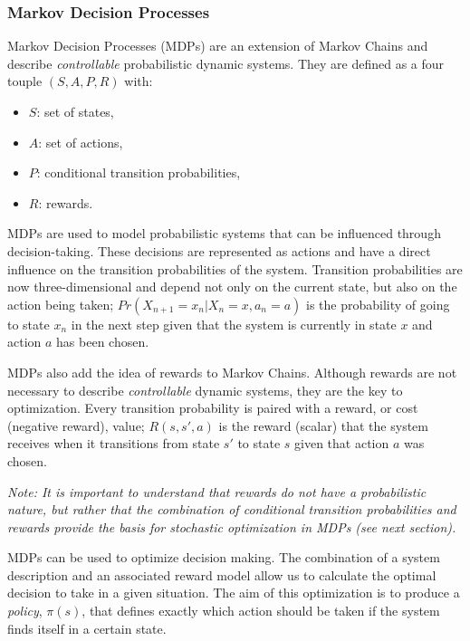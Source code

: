 \subsubsection{Markov Decision Processes}

Markov Decision Processes (MDPs) are an extension of Markov Chains and describe \textit{controllable} probabilistic dynamic systems. They are defined as a four touple $(S,A,P,R)$ with:
\begin{itemize}
\item $S$: set of states,
\item $A$: set of actions,
\item $P$: conditional transition probabilities,
\item $R$: rewards.
\end{itemize}


MDPs are used to model probabilistic systems that can be influenced through decision-taking. These decisions are represented as actions and have a direct influence on the transition probabilities of the system. Transition probabilities are now three-dimensional and depend not only on the current state, but also on the action being taken; $Pr(X_{n+1}=x_n|X_n=x,a_n=a)$ is the probability of going to state $x_n$ in the next step given that the system is currently in state $x$ and action $a$ has been chosen.


MDPs also add the idea of rewards to Markov Chains. Although rewards are not necessary to describe \textit{controllable} dynamic systems, they are the key to optimization. Every transition probability is paired with a reward, or cost (negative reward), value; $R(s,s',a)$ is the reward (scalar) that the system receives when it transitions from state $s'$ to state $s$ given that action $a$ was chosen.

\textit{Note: It is important to understand that rewards do not have a probabilistic nature, but rather that the combination of conditional transition probabilities and rewards provide the basis for stochastic optimization in MDPs (see next section).}


MDPs can be used to optimize decision making. The combination of a system description and an associated reward model allow us to calculate the optimal decision to take in a given situation. The aim of this optimization is to produce a \textit{policy}, $\pi(s)$, that defines exactly which action should be taken if the system finds itself in a certain state.

